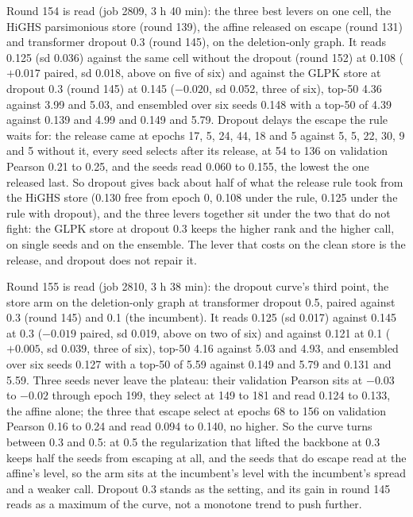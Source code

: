 Round 154 is read (job 2809, 3 h 40 min): the three best levers on one cell, the HiGHS
parsimonious store (round 139), the affine released on escape (round 131) and
transformer dropout 0.3 (round 145), on the deletion-only graph. It reads 0.125 (sd
0.036) against the same cell without the dropout (round 152) at 0.108 ($+0.017$ paired,
sd 0.018, above on five of six) and against the GLPK store at dropout 0.3 (round 145)
at 0.145 ($-0.020$, sd 0.052, three of six), top-50 4.36 against 3.99 and 5.03, and
ensembled over six seeds 0.148 with a top-50 of 4.39 against 0.139 and 4.99 and 0.149
and 5.79. Dropout delays the escape the rule waits for: the release came at epochs 17,
5, 24, 44, 18 and 5 against 5, 5, 22, 30, 9 and 5 without it, every seed selects after
its release, at 54 to 136 on validation Pearson 0.21 to 0.25, and the seeds read 0.060
to 0.155, the lowest the one released last. So dropout gives back about half of what the
release rule took from the HiGHS store (0.130 free from epoch 0, 0.108 under the rule,
0.125 under the rule with dropout), and the three levers together sit under the two
that do not fight: the GLPK store at dropout 0.3 keeps the higher rank and the higher
call, on single seeds and on the ensemble. The lever that costs on the clean store is
the release, and dropout does not repair it.

Round 155 is read (job 2810, 3 h 38 min): the dropout curve's third point, the store
arm on the deletion-only graph at transformer dropout 0.5, paired against 0.3 (round
145) and 0.1 (the incumbent). It reads 0.125 (sd 0.017) against 0.145 at 0.3 ($-0.019$
paired, sd 0.019, above on two of six) and against 0.121 at 0.1 ($+0.005$, sd 0.039,
three of six), top-50 4.16 against 5.03 and 4.93, and ensembled over six seeds 0.127
with a top-50 of 5.59 against 0.149 and 5.79 and 0.131 and 5.59. Three seeds never
leave the plateau: their validation Pearson sits at $-0.03$ to $-0.02$ through epoch
199, they select at 149 to 181 and read 0.124 to 0.133, the affine alone; the three
that escape select at epochs 68 to 156 on validation Pearson 0.16 to 0.24 and read
0.094 to 0.140, no higher. So the curve turns between 0.3 and 0.5: at 0.5 the
regularization that lifted the backbone at 0.3 keeps half the seeds from escaping at
all, and the seeds that do escape read at the affine's level, so the arm sits at the
incumbent's level with the incumbent's spread and a weaker call. Dropout 0.3 stands as
the setting, and its gain in round 145 reads as a maximum of the curve, not a monotone
trend to push further.

